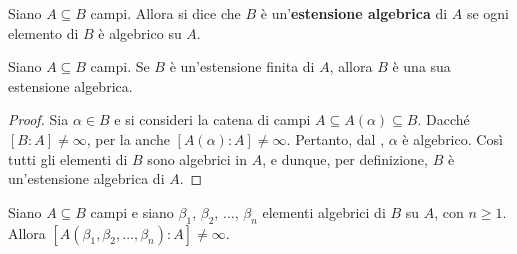 \documentclass[11pt]{scrbook}
\begin{document}
\begin{definition}
    Siano $A \subseteq B$ campi. Allora si dice che $B$ è
    un'\textbf{estensione algebrica} di $A$ se ogni elemento
    di $B$ è algebrico su $A$.
\end{definition}

\begin{proposition}
    \label{prop:estensione_finita_algebrica}
    Siano $A \subseteq B$ campi. Se $B$ è un'estensione finita
    di $A$, allora $B$ è una sua estensione algebrica.
\end{proposition}

\begin{proof}
    Sia $\alpha \in B$ e si consideri la catena di campi $A \subseteq A(\alpha)
        \subseteq B$. Dacché $[B : A] \neq \infty$, per la 
    anche $[A(\alpha) : A] \neq \infty$. Pertanto, dal , $\alpha$ è algebrico. Così tutti gli elementi
    di $B$ sono algebrici in $A$, e dunque, per definizione, $B$ è un'estensione
    algebrica di $A$.
\end{proof}

\begin{theorem}
    \label{th:somma_prodotto_algebrici}
    Siano $A \subseteq B$ campi e siano $\beta_1$, $\beta_2$, $\ldots$, $\beta_n$
    elementi algebrici di $B$ su $A$, con $n \geq 1$.
    Allora $[A(\beta_1, \beta_2, \ldots, \beta_n) : A] \neq \infty$.
\end{theorem}
\end{document}
